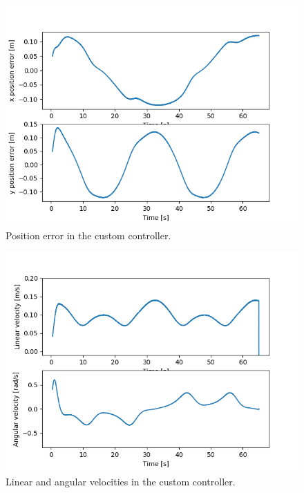 \documentclass[11pt,a4paper]{article}
\begin{document}
\begin{figure}[H]
    \centering
    \includegraphics[scale=0.4]{kin_screenshots/Position_Error.png}
    \caption{Position error in the custom controller.}
\end{figure}

\begin{figure}[H]
    \centering
    \includegraphics[scale=0.4]{kin_screenshots/Linear_and_Angular_Velocities.png}
    \caption{Linear and angular velocities in the custom controller.}
\end{figure}
\end{document}

